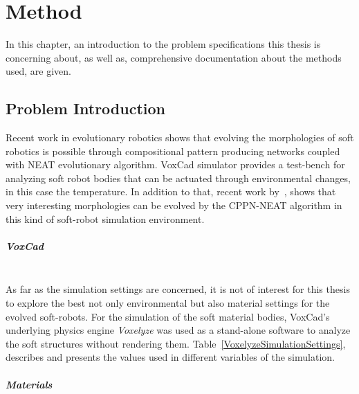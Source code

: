 
\chapter{Method} %

\label{Method} %


In this chapter, an introduction to the problem specifications this thesis is concerning about, as well as, comprehensive documentation about the methods used, are given.


\section{Problem Introduction}

Recent work in evolutionary robotics shows that evolving the morphologies of soft robotics is possible through compositional pattern producing networks coupled with NEAT evolutionary algorithm. VoxCad simulator provides a test-bench for analyzing soft robot bodies that can be actuated through environmental changes, in this case the temperature. In addition to that, recent work by~\cite{cheney2013unshackling}, shows that very interesting morphologies can be evolved by the CPPN-NEAT algorithm in this kind of soft-robot simulation environment.

\paragraph{VoxCad}~\\
As far as the simulation settings are concerned, it is not of interest for this thesis to explore the best  not only environmental but also material settings for the evolved soft-robots. For the simulation of the soft material bodies, VoxCad's underlying physics engine \emph{Voxelyze} was used as a stand-alone software to analyze the soft structures without rendering them. Table~\ref{VoxelyzeSimulationSettings}, describes and presents the values used in different variables of the simulation.



\paragraph{Materials}~\\


